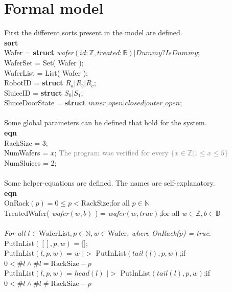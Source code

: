 \documentclass[12pt]{report}
\begin{document}
	\section{Formal model}
	First the different sorts present in the model are defined.\\
	\textbf{sort}\\
	\phantom{----} Wafer = \textbf{struct} \emph{wafer}$( id:\mathbb{Z}, treated:\mathbb{B} ) | Dummy?IsDummy$;\\
	\phantom{----} WaferSet = Set( Wafer );\\
	\phantom{----} WaferList = List( Wafer );\\
	\phantom{----} RobotID = \textbf{struct} $R_a | R_b | R_c$;\\
	\phantom{----} SluiceID = \textbf{struct} $S_0 | S_1$;\\
	\phantom{----} SluiceDoorState = \textbf{struct} $inner\_open|closed|outer\_open$;\\
	\\
	Some global parameters can be defined that hold for the system.\\
	\textbf{eqn}\\
	\phantom{----} RackSize = 3;\\
	\phantom{----} NumWafers = $x$; \textcolor{gray}{The program was verified for every $\{x \in \mathbb{Z} | 1 \leq x \leq 5\}$}\\
	\phantom{----} NumSluices = 2;\\
	\\
	Some helper-equations are defined. The names are self-explanatory.\\
	\textbf{eqn}\\
	\phantom{----} OnRack$( p ) = 0 \leq p < \text{RackSize}$;\hfill for all $p \in \mathbb{N}$\\
	\phantom{----} TreatedWafer(  \emph{wafer}$( w, b )$ ) =  \emph{wafer}$( w, true )$;\hfill for all $w \in \mathbb{Z}, b \in \mathbb{B}$\\
	\\
	\phantom{----} \emph{For all $l \in \text{WaferList}, p \in \mathbb{N}, w \in \text{Wafer}$, where OnRack($p$) = true}:\\
	\phantom{----} PutInList$( [], p, w )$ = [];\\
	\phantom{----} PutInList$( l, p, w )$ = $w$ $|>$ PutInList$( tail( l ), p, w )$;\hfill if $0 < \#l \land \#l = \text{RackSize} - p$\\
	\phantom{----} PutInList$( l, p, w )$ = $ head( l )$ $|>$ PutInList$( tail( l ), p, w )$;\hfill if $0 < \#l \land \#l \neq \text{RackSize} - p$\\
\end{document}
